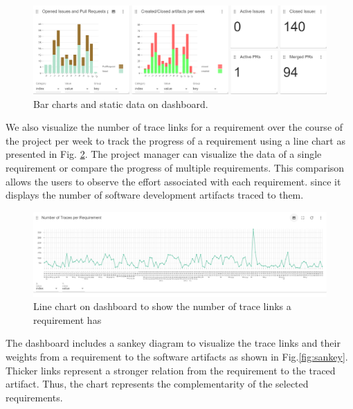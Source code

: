 \begin{figure}[hbt]
    \centering
    \includegraphics[width=.9\linewidth]{figs/dashboard-barcharts.png}
    \caption{Bar charts and static data on dashboard.}
    \label{fig:barcharts}
\end{figure}

We also visualize the number of trace links for a requirement over the course of the project per week to track the progress of a requirement using a line chart as presented in Fig. \ref{fig:linechart}. The project manager can visualize the data of a single requirement or compare the progress of multiple requirements. %
This comparison allows the users to observe the effort associated with each requirement.%
since it displays the number of software development artifacts traced to them.

\begin{figure}[htb]
    \centering
    \includegraphics[width=.9\linewidth]{figs/linechart.png}
    \caption{Line chart on dashboard to show the number of trace links a requirement has}
    \label{fig:linechart}
\end{figure}

The dashboard includes a sankey diagram to visualize the trace links and their weights from a requirement to the software artifacts as shown in Fig.\ref{fig:sankey}. %
Thicker links represent a stronger relation from the requirement to the traced artifact. Thus, the chart represents the complementarity of the selected requirements.

